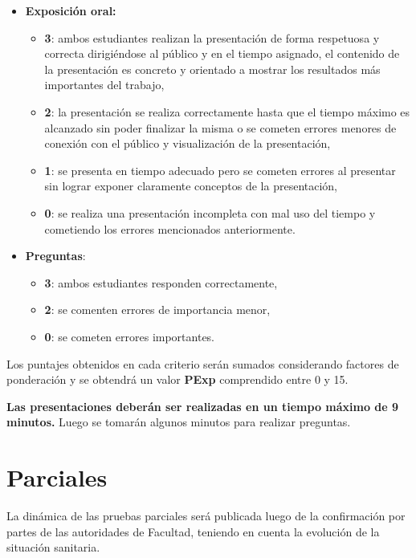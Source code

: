 \documentclass[a4paper,11pt,twocolumn]{article}
\begin{document}
\begin{itemize}
	\item \textbf{Exposición oral:} %
	\begin{itemize}
		\item \textbf{3}: ambos estudiantes realizan la presentación de forma respetuosa y correcta dirigiéndose al público y en el tiempo asignado, el contenido de la presentación es concreto y orientado a mostrar los resultados más importantes del trabajo,
		\item \textbf{2}: la presentación se realiza correctamente hasta que el tiempo máximo es alcanzado sin poder finalizar la misma o se cometen errores menores de conexión con el público y visualización de la presentación,
		\item \textbf{1}: se presenta en tiempo adecuado pero se cometen errores al presentar sin lograr exponer claramente conceptos de la presentación,
		\item \textbf{0}: se realiza una presentación incompleta con mal uso del tiempo y cometiendo los errores mencionados anteriormente.
	\end{itemize}
	
	\item \textbf{Preguntas}:
	\begin{itemize}
		\item \textbf{3}: ambos estudiantes responden correctamente,
		\item \textbf{2}: se comenten errores de importancia menor,
		\item \textbf{0}: se cometen errores importantes.
	\end{itemize}
	
\end{itemize}
%

Los puntajes obtenidos en cada criterio serán sumados considerando factores de ponderación y se obtendrá un valor \textbf{PExp} comprendido entre 0 y 15. %

\textbf{Las presentaciones deberán ser realizadas en un tiempo máximo de 9 minutos.} Luego se tomarán algunos minutos para realizar preguntas.



\section{Parciales}

La dinámica de las pruebas parciales será publicada luego de la confirmación por partes de las autoridades de Facultad, teniendo en cuenta la evolución de la situación sanitaria.
\end{document}
